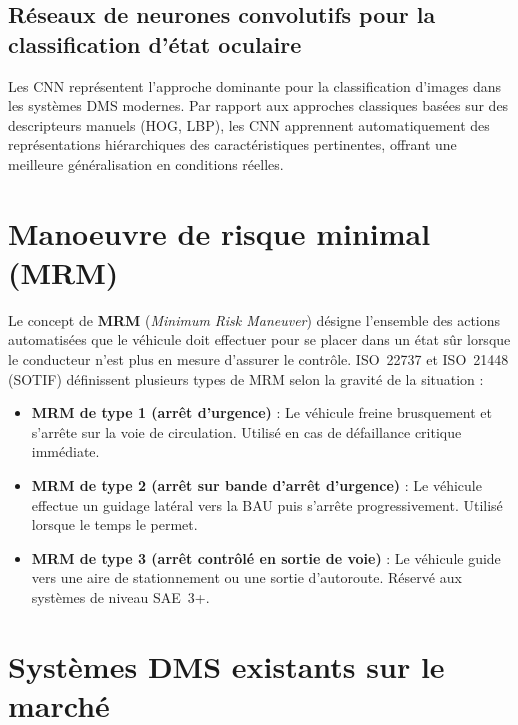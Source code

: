 \documentclass[12pt,a4paper]{report}
\begin{document}
\subsection{R\'eseaux de neurones convolutifs pour la classification d'\'etat oculaire}

Les CNN repr\'esentent l'approche dominante pour la classification d'images dans les syst\`emes DMS modernes. Par rapport aux approches classiques bas\'ees sur des descripteurs manuels (HOG, LBP), les CNN apprennent automatiquement des repr\'esentations hi\'erarchiques des caract\'eristiques pertinentes, offrant une meilleure g\'en\'eralisation en conditions r\'eelles.

\section{Manoeuvre de risque minimal (MRM)}

Le concept de \textbf{MRM} (\textit{Minimum Risk Maneuver}) d\'esigne l'ensemble des actions automatis\'ees que le v\'ehicule doit effectuer pour se placer dans un \'etat s\^ur lorsque le conducteur n'est plus en mesure d'assurer le contr\^ole. ISO~22737 et ISO~21448 (SOTIF) d\'efinissent plusieurs types de MRM selon la gravit\'e de la situation :

\begin{itemize}
  \item \textbf{MRM de type 1 (arr\^et d'urgence)} : Le v\'ehicule freine brusquement et s'arr\^ete sur la voie de circulation. Utilis\'e en cas de d\'efaillance critique imm\'ediate.
  \item \textbf{MRM de type 2 (arr\^et sur bande d'arr\^et d'urgence)} : Le v\'ehicule effectue un guidage lat\'eral vers la BAU puis s'arr\^ete progressivement. Utilis\'e lorsque le temps le permet.
  \item \textbf{MRM de type 3 (arr\^et contr\^ol\'e en sortie de voie)} : Le v\'ehicule guide vers une aire de stationnement ou une sortie d'autoroute. R\'eserv\'e aux syst\`emes de niveau SAE~3+.
\end{itemize}

\section{Syst\`emes DMS existants sur le march\'e}
\end{document}
